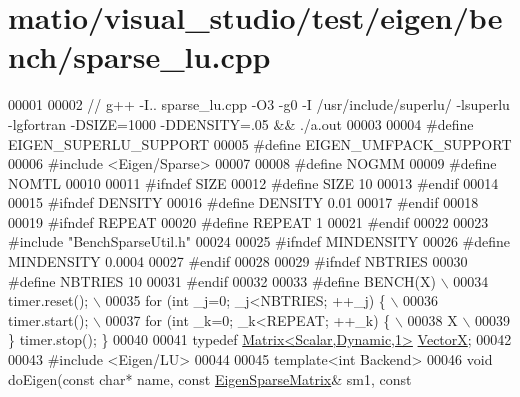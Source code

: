 \hypertarget{matio_2visual__studio_2test_2eigen_2bench_2sparse__lu_8cpp_source}{}\section{matio/visual\+\_\+studio/test/eigen/bench/sparse\+\_\+lu.cpp}
\label{matio_2visual__studio_2test_2eigen_2bench_2sparse__lu_8cpp_source}

\begin{DoxyCode}
00001 
00002 \textcolor{comment}{// g++ -I.. sparse\_lu.cpp -O3 -g0 -I /usr/include/superlu/ -lsuperlu -lgfortran -DSIZE=1000 -DDENSITY=.05
       && ./a.out}
00003 
00004 \textcolor{preprocessor}{#define EIGEN\_SUPERLU\_SUPPORT}
00005 \textcolor{preprocessor}{#define EIGEN\_UMFPACK\_SUPPORT}
00006 \textcolor{preprocessor}{#include <Eigen/Sparse>}
00007 
00008 \textcolor{preprocessor}{#define NOGMM}
00009 \textcolor{preprocessor}{#define NOMTL}
00010 
00011 \textcolor{preprocessor}{#ifndef SIZE}
00012 \textcolor{preprocessor}{#define SIZE 10}
00013 \textcolor{preprocessor}{#endif}
00014 
00015 \textcolor{preprocessor}{#ifndef DENSITY}
00016 \textcolor{preprocessor}{#define DENSITY 0.01}
00017 \textcolor{preprocessor}{#endif}
00018 
00019 \textcolor{preprocessor}{#ifndef REPEAT}
00020 \textcolor{preprocessor}{#define REPEAT 1}
00021 \textcolor{preprocessor}{#endif}
00022 
00023 \textcolor{preprocessor}{#include "BenchSparseUtil.h"}
00024 
00025 \textcolor{preprocessor}{#ifndef MINDENSITY}
00026 \textcolor{preprocessor}{#define MINDENSITY 0.0004}
00027 \textcolor{preprocessor}{#endif}
00028 
00029 \textcolor{preprocessor}{#ifndef NBTRIES}
00030 \textcolor{preprocessor}{#define NBTRIES 10}
00031 \textcolor{preprocessor}{#endif}
00032 
00033 \textcolor{preprocessor}{#define BENCH(X) \(\backslash\)}
00034 \textcolor{preprocessor}{  timer.reset(); \(\backslash\)}
00035 \textcolor{preprocessor}{  for (int \_j=0; \_j<NBTRIES; ++\_j) \{ \(\backslash\)}
00036 \textcolor{preprocessor}{    timer.start(); \(\backslash\)}
00037 \textcolor{preprocessor}{    for (int \_k=0; \_k<REPEAT; ++\_k) \{ \(\backslash\)}
00038 \textcolor{preprocessor}{        X  \(\backslash\)}
00039 \textcolor{preprocessor}{  \} timer.stop(); \}}
00040 
00041 \textcolor{keyword}{typedef} \hyperlink{group___core___module}{Matrix<Scalar,Dynamic,1>} \hyperlink{group___core___module}{VectorX};
00042 
00043 \textcolor{preprocessor}{#include <Eigen/LU>}
00044 
00045 \textcolor{keyword}{template}<\textcolor{keywordtype}{int} Backend>
00046 \textcolor{keywordtype}{void} doEigen(\textcolor{keyword}{const} \textcolor{keywordtype}{char}* name, \textcolor{keyword}{const} \hyperlink{group___sparse_core___module}{EigenSparseMatrix}& sm1, \textcolor{keyword}{const} 

\end{DoxyCode}
